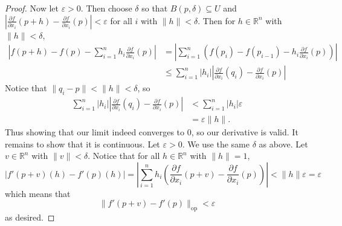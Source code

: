 \documentclass{article}
\newcommand{\op}{\mathrm{op}}
\theoremstyle{plain} %
\numberwithin{thm}{section} %
\theoremstyle{definition}
\begin{document}
\begin{proof}
        Now let \(\varepsilon > 0\). Then choose \(\delta\) so that \(B(p, \delta) \subseteq U\) and \(\left\vert\frac{\partial f}{\partial x_i} (p + h) - \frac{\partial f}{\partial x_i} (p)\right\vert < \varepsilon\) for all \(i\) with \(\|h\| < \delta\). Then for \(h \in \mathbb{R}^n\) with \(\|h\| < \delta\),
        \begin{align*}
            \left\vert f(p + h) - f(p) - \sum_{i=1}^{n} h_i \frac{\partial f}{\partial x_i} (p)  \right\vert &= \left\vert \sum_{i=1}^{n} \left(f(p_i) - f(p_{i-1}) - h_i \frac{\partial f}{\partial x_i} (p)\right) \right\vert \\
            &\leq \sum_{i=1}^{n} |h_i| \left\vert \frac{\partial f}{\partial x_i} (q_i) - \frac{\partial f}{\partial x_i} (p) \right\vert
        \end{align*}
        Notice that \(\|q_i - p\| < \|h\| < \delta\), so
        \begin{align*}
            \sum_{i=1}^{n} |h_i| \left\vert \frac{\partial f}{\partial x_i} (q_i) - \frac{\partial f}{\partial x_i} (p) \right\vert &< \sum_{i=1}^{n} |h_i| \varepsilon \\
            &= \varepsilon \|h\|.
        \end{align*}
        Thus showing that our limit indeed converges to 0, so our derivative is valid. It remains to show that it is continuous. Let \(\varepsilon > 0\). We use the same \(\delta\) as above. Let \(v \in \mathbb{R}^n\) with \(\|v\| < \delta\). Notice that for all \(h \in \mathbb{R}^n\) with \(\|h\| = 1\),
        \[
            |f'(p + v)(h) - f'(p)(h)| = \left\vert\sum_{i=1}^{n} h_i \left( \frac{\partial f}{\partial x_i} (p + v) - \frac{\partial f}{\partial x_i} (p) \right)\right\vert < \|h\| \varepsilon = \varepsilon
        \]
        which means that
        \[
            \|f'(p+v) - f'(p)\| _{\op} < \varepsilon
        \]
        as desired.
    \end{proof}
\end{document}
